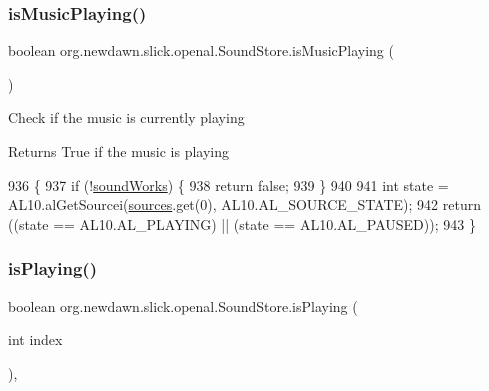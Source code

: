 \subsubsection{\texorpdfstring{is\+Music\+Playing()}{isMusicPlaying()}}
{\footnotesize\ttfamily boolean org.\+newdawn.\+slick.\+openal.\+Sound\+Store.\+is\+Music\+Playing (\begin{DoxyParamCaption}{ }\end{DoxyParamCaption})\hspace{0.3cm}{\ttfamily [inline]}}

Check if the music is currently playing

\begin{DoxyReturn}{Returns}
True if the music is playing 
\end{DoxyReturn}

\begin{DoxyCode}
936     \{
937         \textcolor{keywordflow}{if} (!\mbox{\hyperlink{classorg_1_1newdawn_1_1slick_1_1openal_1_1_sound_store_ae563e9c1a01e333dc2350f1450f451fd}{soundWorks}}) \{
938             \textcolor{keywordflow}{return} \textcolor{keyword}{false};
939         \}
940         
941         \textcolor{keywordtype}{int} state = AL10.alGetSourcei(\mbox{\hyperlink{classorg_1_1newdawn_1_1slick_1_1openal_1_1_sound_store_a3a2ffa73acd847102bb30140129c440b}{sources}}.get(0), AL10.AL\_SOURCE\_STATE);
942         \textcolor{keywordflow}{return} ((state == AL10.AL\_PLAYING) || (state == AL10.AL\_PAUSED));
943     \}
\end{DoxyCode}
\mbox{\label{classorg_1_1newdawn_1_1slick_1_1openal_1_1_sound_store_a986a26824f143a9fa9df2161b13edd44}} 
\subsubsection{\texorpdfstring{is\+Playing()}{isPlaying()}\hspace{0.1cm}{\footnotesize\ttfamily [1/2]}}
{\footnotesize\ttfamily boolean org.\+newdawn.\+slick.\+openal.\+Sound\+Store.\+is\+Playing (\begin{DoxyParamCaption}\item[{int}]{index }\end{DoxyParamCaption})\hspace{0.3cm}{\ttfamily [inline]}, {\ttfamily [package]}}

